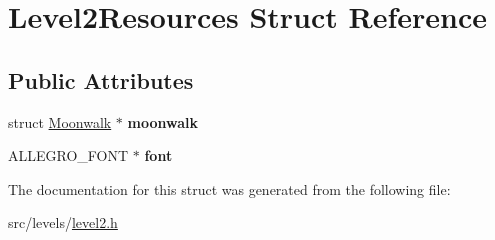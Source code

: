 \hypertarget{structLevel2Resources}{\section{Level2\+Resources Struct Reference}
\label{structLevel2Resources}
}
\subsection*{Public Attributes}
\begin{DoxyCompactItemize}
\item 
\hypertarget{structLevel2Resources_ae279368acefb62e772d4da46fbcc4e2d}{struct \hyperlink{structMoonwalk}{Moonwalk} $\ast$ {\bfseries moonwalk}}\label{structLevel2Resources_ae279368acefb62e772d4da46fbcc4e2d}

\item 
\hypertarget{structLevel2Resources_a76779fef658d3105374f6b36f107cd36}{A\+L\+L\+E\+G\+R\+O\+\_\+\+F\+O\+N\+T $\ast$ {\bfseries font}}\label{structLevel2Resources_a76779fef658d3105374f6b36f107cd36}

\end{DoxyCompactItemize}


The documentation for this struct was generated from the following file\+:\begin{DoxyCompactItemize}
\item 
src/levels/\hyperlink{level2_8h}{level2.\+h}\end{DoxyCompactItemize}
